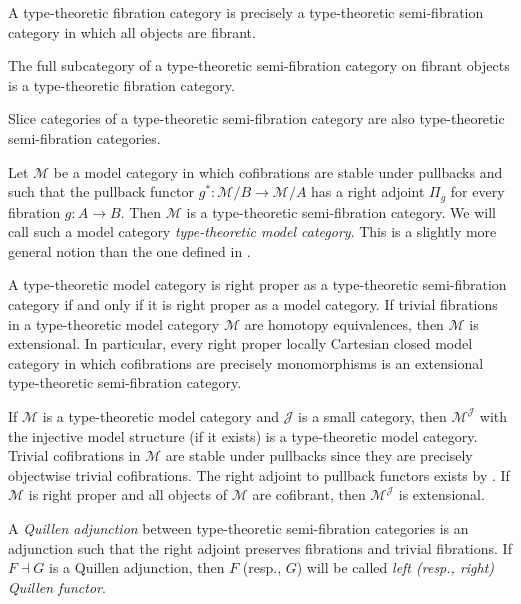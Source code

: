 \documentclass[reqno]{amsart}
\theoremstyle{definition}
\theoremstyle{remark}
\newcommand{\scat}[1]{\mathcal{#1}}
\numberwithin{figure}{section}
\begin{document}
\begin{remark}
A type-theoretic fibration category is precisely a type-theoretic semi-fibration category in which all objects are fibrant.
\end{remark}

\begin{remark}
The full subcategory of a type-theoretic semi-fibration category on fibrant objects is a type-theoretic fibration category.
\end{remark}

\begin{remark}
Slice categories of a type-theoretic semi-fibration category are also type-theoretic semi-fibration categories.
\end{remark}

\begin{example}
Let $\scat{M}$ be a model category in which cofibrations are stable under pullbacks and such that the pullback functor $g^* : \scat{M}/B \to \scat{M}/A$ has a right adjoint $\Pi_g$ for every fibration $g : A \to B$.
Then $\scat{M}$ is a type-theoretic semi-fibration category.
We will call such a model category \emph{type-theoretic model category}.
This is a slightly more general notion than the one defined in \cite[Definition~2.12]{shul-inv}.

A type-theoretic model category is right proper as a type-theoretic semi-fibration category if and only if it is right proper as a model category.
If trivial fibrations in a type-theoretic model category $\scat{M}$ are homotopy equivalences, then $\scat{M}$ is extensional.
In particular, every right proper locally Cartesian closed model category in which cofibrations are precisely monomorphisms is an extensional type-theoretic semi-fibration category.
\end{example}

\begin{example}
If $\scat{M}$ is a type-theoretic model category and $\scat{J}$ is a small category, then $\scat{M}^\scat{J}$ with the injective model structure (if it exists) is a type-theoretic model category.
Trivial cofibrations in $\scat{M}$ are stable under pullbacks since they are precisely objectwise trivial cofibrations.
The right adjoint to pullback functors exists by \cite[Theorem~2.12]{comp-fact-tor}.
If $\scat{M}$ is right proper and all objects of $\scat{M}$ are cofibrant, then $\scat{M}^\scat{J}$ is extensional.
\end{example}

\begin{defn}
A \emph{Quillen adjunction} between type-theoretic semi-fibration categories is an adjunction such that the right adjoint preserves fibrations and trivial fibrations.
If $F \dashv G$ is a Quillen adjunction, then $F$ (resp., $G$) will be called \emph{left (resp., right) Quillen functor}.
\end{defn}
\end{document}
